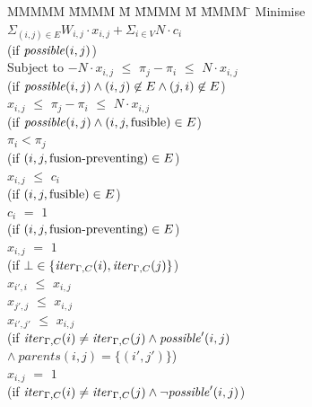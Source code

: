 \begin{figure}
\begin{tabbing}
MMMMM   \= MMMM \= M \= MMMM \= M \= MMMM \= \kill
Minimise   \> $\Sigma_{(i,j) \in E} W_{i,j} \cdot x_{i,j} + \Sigma_{i \in V} N \cdot c_i$  \\
           \> (if $\mathit{possible}(i,j)$)         
\\[0.5ex]
Subject to \> $-N \cdot x_{i,j}$ \> $\le$ \> $\pi_j - \pi_i$ \> $\le$ \> $N \cdot x_{i,j}$ \\
           \> (if $\mathit{possible}(i,j) \wedge (i,j) \not\in E \wedge (j,i) \not\in E$)            
\\[0.5ex]
           \>    $x_{i,j}$ \> $\le$ \> $\pi_j - \pi_i$ \> $\le$ \> $N \cdot x_{i,j}$ \\
           \> (if $\mathit{possible}(i,j) \wedge (i,j,\mathrm{fusible}) \in E$)     
\\[0.5ex]
           \>             \>       \> $\pi_i < \pi_j$ \>       \>            \\
           \> (if $(i,j,\mbox{fusion-preventing}) \in E$)    
\\[0.5ex]
           \> $x_{i,j}$    \> $\le$ \> $c_i$           \>       \>            \\
           \> (if $(i,j, \mathrm{fusible}) \in E$) \\
           \> $c_{i }$    \> $ = $ \> $ 1 $           \>       \>            \\
           \> (if $(i,j, \mbox{fusion-preventing}) \in E$)
\\[0.5ex]
           \> $x_{i,j}$    \> $=$   \> $1$             \>       \>            \\
           \> (if $\bot \in \{\mathit{iter}_{\Gamma,C}(i), \mathit{iter}_{\Gamma,C}(j)\}$)  
\\[0.5ex]
           \> $x_{i',i}$   \> $\le$ \> $x_{i,j}$        \>       \>            \\
           \> $x_{j',j}$   \> $\le$ \> $x_{i,j}$        \>       \>            \\
           \> $x_{i',j'}$   \> $\le$ \> $x_{i,j}$        \>       \>            \\
           \> (if $\mathit{iter}_{\Gamma,C}(i) \not= \mathit{iter}_{\Gamma,C}(j) \wedge \mathit{possible}'(i,j)$ \\
           \> \> $\wedge~parents(i,j) = \{(i',j')\}$) 
\\[0.5ex]
           \> $x_{i,j}$    \> $=$   \> $1$             \>       \>            \\
           \> (if $\mathit{iter}_{\Gamma,C}(i) \not= \mathit{iter}_{\Gamma,C}(j) \wedge \neg \mathit{possible}'(i,j)$) 

\end{tabbing}
\end{figure}
